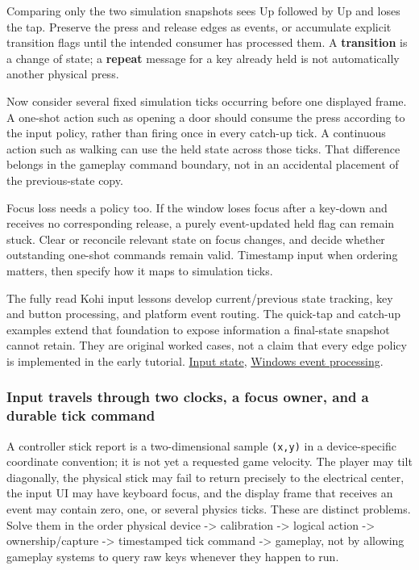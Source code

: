 Comparing only the two simulation snapshots sees Up followed by Up and loses the tap. Preserve the press and release edges as events, or accumulate explicit transition flags until the intended consumer has processed them. A \textbf{transition} is a change of state; a \textbf{repeat} message for a key already held is not automatically another physical press.

Now consider several fixed simulation ticks occurring before one displayed frame. A one-shot action such as opening a door should consume the press according to the input policy, rather than firing once in every catch-up tick. A continuous action such as walking can use the held state across those ticks. That difference belongs in the gameplay command boundary, not in an accidental placement of the previous-state copy.

Focus loss needs a policy too. If the window loses focus after a key-down and receives no corresponding release, a purely event-updated held flag can remain stuck. Clear or reconcile relevant state on focus changes, and decide whether outstanding one-shot commands remain valid. Timestamp input when ordering matters, then specify how it maps to simulation ticks.

The fully read Kohi input lessons develop current/previous state tracking, key and button processing, and platform event routing. The quick-tap and catch-up examples extend that foundation to expose information a final-state snapshot cannot retain. They are original worked cases, not a claim that every edge policy is implemented in the early tutorial. \href{https://www.youtube.com/watch?v=ZZhfCYNbVp8}{Input state}, \href{https://www.youtube.com/watch?v=6zjpgUX1TRY}{Windows event processing}.

\subsubsection{Input travels through two clocks, a focus owner, and a durable tick command}\label{05-engine-i-ch014-input-travels-through-two-clocks-a-focus-owner-and-a-durable-tick-command}

\hypertarget{05-engine-i-ch014-input-travels-through-two-clocks-a-focus-owner-and-a-durable-tick-command}{}

A controller stick report is a two-dimensional sample \texttt{(x,y)} in a device-specific coordinate convention; it is not yet a requested game velocity. The player may tilt diagonally, the physical stick may fail to return precisely to the electrical center, the input UI may have keyboard focus, and the display frame that receives an event may contain zero, one, or several physics ticks. These are distinct problems. Solve them in the order physical device -\textgreater{} calibration -\textgreater{} logical action -\textgreater{} ownership/capture -\textgreater{} timestamped tick command -\textgreater{} gameplay, not by allowing gameplay systems to query raw keys whenever they happen to run.

